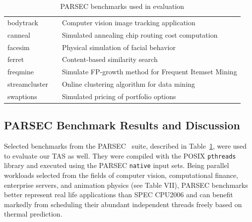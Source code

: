\documentclass[times, 10pt,twocolumn]{IEEEtran}
\begin{document}

\begin{small}
\begin{table}[phbt] 
\centering
 \caption{PARSEC benchmarks used in evaluation}
\label{tab:parsecbench}
\begin{tabular}[bthp]{l l p{5cm}} 
\hline 
\hline 
bodytrack &  & Computer vision image tracking application \\
canneal &  & Simulated annealing chip routing cost computation \\
facesim &  & Physical simulation of facial behavior \\
ferret &  & Content-based similarity search \\
freqmine &  & Simulate FP-growth method for Frequent Itemset Mining \\
streamcluster &  & Online clustering algorithm for data mining \\
swaptions &  & Simulated pricing of portfolio options \\
\hline
\end{tabular}
\end{table}
\end{small}
\subsection{PARSEC Benchmark Results and Discussion}
\label{sec:mult-behav} 
Selected benchmarks from the PARSEC~\cite{Bienia2008} suite, described
in Table~\ref{tab:parsecbench}, were used to evaluate our TAS as well.
They were compiled with the POSIX \texttt{pthreads} library and executed
using the PARSEC \texttt{native} input sets.  Being parallel workloads
selected from the fields of computer vision, computational finance,
enterprise servers, and animation physics (see Table VII), PARSEC
benchmarks better represent real life applications than SPEC CPU2006 and
can benefit markedly from scheduling their abundant independent threads
freely based on thermal prediction.
\end{document}
